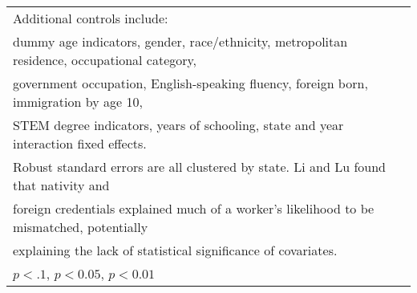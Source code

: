 \begin{table}[htbp]
\begin{tabular}{l*{3}{c}}
\bottomrule
\multicolumn{4}{l}{\footnotesize Additional controls include:}\\
\multicolumn{4}{l}{\footnotesize dummy age indicators, gender, race/ethnicity, metropolitan residence, occupational category,}\\
\multicolumn{4}{l}{\footnotesize government occupation, English-speaking fluency, foreign born, immigration by age 10,}\\
\multicolumn{4}{l}{\footnotesize STEM degree indicators, years of schooling, state and year interaction fixed effects.}\\
\multicolumn{4}{l}{\footnotesize Robust standard errors are all clustered by state. Li and Lu found that nativity and}\\
\multicolumn{4}{l}{\footnotesize foreign credentials explained much of a worker's likelihood to be mismatched, potentially}\\
\multicolumn{4}{l}{\footnotesize explaining the lack of statistical significance of covariates.}\\
\multicolumn{4}{l}{\footnotesize \sym{*} \(p<.1\), \sym{**} \(p<0.05\), \sym{***} \(p<0.01\)}\\
\end{tabular}
\end{table}
